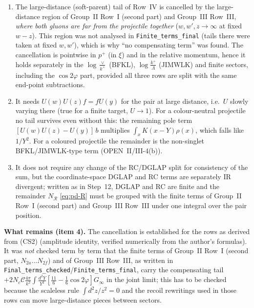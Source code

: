 \begin{enumerate}
\item The large-distance (soft-parent) tail of Row~IV is cancelled by the large-distance region of Group~II Row~I (second part) and Group~III Row~III, \emph{where both gluons are far from the projectile together} ($w,w',z\to\infty$ at fixed $w-z$). This region was not analysed in \texttt{Finite\_terms\_final} (tails there were taken at fixed $w,w'$), which is why ``no compensating term'' was found. The cancellation is pointwise in $p^{+}$ (in $\xi$) and in the relative momentum, hence it holds separately in the $\log\frac{\vee}{k^{+}}$ (BFKL), $\log\frac{k^{+}}{\Lambda}$ (JIMWLK) and finite sectors, including the $\cos2\varphi$ part, provided all three rows are split with the same end-point subtractions.
\item It needs $U(w)U(z)f=fU(y)$ for the pair at large distance, i.e.\ $U$ slowly varying there (true for a finite target, $U\to1$). For a colour-neutral projectile no tail survives even without this: the remaining pole term $[U(w)U(z)-U(y)]\,b$ multiplies $\int_{x}K(x-Y)\rho(x)$, which falls like $1/Y^{2}$. For a coloured projectile the remainder is the non-singlet BFKL/JIMWLK-type term (OPEN~II/III-4(b)).
\item It does not require any change of the RC/DGLAP split for consistency of the sum, but the coordinate-space DGLAP and RC terms are separately IR divergent; written as in Step~12, DGLAP and RC are finite and the remainder $N_{\mathcal{R}}$ \eqref{eq:pd-R} must be grouped with the finite terms of Group~II Row~I (second part) and Group~III Row~III under one integral over the pair position.
\end{enumerate}
\noindent\textbf{What remains (item 4).} The cancellation is established for the rows as derived from (CS2) (amplitude identity, verified numerically from the author's formulas). It was \emph{not} checked term by term that the finite terms of Group~II Row~I (second part, $N_{2a}\dots N_{2f}$) and of Group~III Row~III, as written in \texttt{Final\_terms\_checked}/\texttt{Finite\_terms\_final}, carry the compensating tail $+2N_{c}\mathcal{C}\frac{4\pi}{k^{2}}\int\frac{d^{2}Y}{Y^{2}}[\frac{11}{6}-\frac16\cos2\varphi]G_{\infty}$ in the joint limit; this has to be checked because the scaleless rule $\int d^{2}z/z^{2}=0$ and the recoil rewritings used in those rows can move large-distance pieces between sectors.

